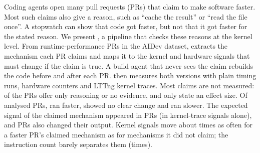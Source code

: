 Coding agents open many pull requests (PRs) that claim to make software
faster. Most such claims also give a reason, such as ``cache the result''
or ``read the file once''. A stopwatch can show that code got faster, but
not that it got faster for the stated reason. We present \sys, a
pipeline that checks these reasons at the kernel level. From \nRuntimePRs
runtime-performance PRs in the AIDev dataset, \sys extracts the mechanism each PR claims and maps it to the kernel
and hardware signals that must change if the claim is true. A build agent
that never sees the claim rebuilds the code before and after each PR.
\sys then measures both versions with plain timing runs, hardware counters and
LTTng kernel traces. Most claims are not measured: \pctReasonNone of the
PRs offer only reasoning or no evidence, and only \pctEffect state an
effect size. Of \nAnalysed analysed PRs, \nFaster ran faster, \nNoChange
showed no clear change and \nSlower ran slower. The expected signal of the
claimed mechanism appeared in \nHeld PRs (\nHeldKernel in kernel-trace
signals alone), and \nBehaviour PRs also changed
their output. Kernel signals move about \kRatioFast times as often for a
faster PR's claimed mechanism as for mechanisms it did not claim; the
instruction count barely separates them (\iRatioFast times).
